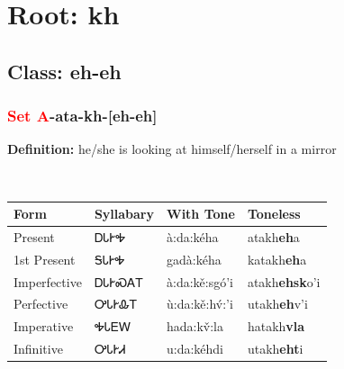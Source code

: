 \needspace{4in}
\section*{Root: kh}
\nopagebreak
{}
\needspace{3in}
\subsection*{Class: eh-eh}
\nopagebreak
\needspace{2in}
\subsubsection*{\textcolor{Red}{Set A}{-}ata{-}\textbf{kh}{-}[eh-eh]}
\nopagebreak
\textbf{Definition: } he/she is looking at himself/herself in a mirror
\\[0.5em]
\begin{tabularx}{\textwidth}{l X X X}%
\toprule%
\textbf{Form}&\textbf{Syllabary}&\textbf{With Tone}&\textbf{Toneless}\\%
\midrule%
Present&ᎠᏓᎨᎭ&à:da:kéha&atakh\textbf{eh}a\\%
1st Present&ᎦᏓᎨᎭ&gadà:kéha&katakh\textbf{eh}a\\%
Imperfective&ᎠᏓᎨᏍᎪᎢ&à:da:kě:sgó’i&atakh\textbf{ehsk}o'i\\%
Perfective&ᎤᏓᎨᎲᎢ&ù:da:kě:hv́:’i&utakh\textbf{eh}v'i\\%
Imperative&ᎭᏓᎬᎳ&hada:kv̌:la&hatakh\textbf{vla}\\%
Infinitive&ᎤᏓᎨᏗ&u:da:kéhdi&utakh\textbf{eht}i\\%
\bottomrule%
\end{tabularx}
\\[1em]